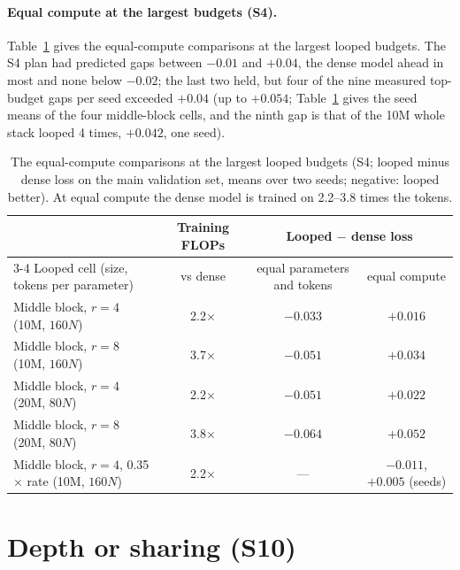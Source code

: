 \paragraph{Equal compute at the largest budgets (S4).} Table~\ref{tab:equalcompute} gives the equal-compute comparisons at the
largest looped budgets. The S4 plan had predicted gaps between $-0.01$ and $+0.04$, the dense model ahead in most and none
below $-0.02$; the last two held, but four of the nine measured top-budget gaps per seed exceeded $+0.04$ (up to $+0.054$;
Table~\ref{tab:equalcompute} gives the seed means of the four middle-block cells, and the ninth gap is that of the 10M
whole stack looped 4 times, $+0.042$, one seed).

\begin{table}[h]
  \centering
  \caption{The equal-compute comparisons at the largest looped budgets (S4; looped minus dense loss on the main
  validation set, means over two seeds; negative: looped better). At equal compute the dense model is trained on 2.2--3.8
  times the tokens.}
  \label{tab:equalcompute}
  \footnotesize
  \begin{tabular}{lccc}
    \toprule
    & Training FLOPs & \multicolumn{2}{c}{Looped $-$ dense loss} \\
    \cmidrule(lr){3-4}
    Looped cell (size, tokens per parameter) & vs dense & equal parameters and tokens & equal compute \\
    \midrule
    Middle block, $r=4$ (10M, $160N$) & 2.2$\times$ & $-0.033$ & $+0.016$ \\
    Middle block, $r=8$ (10M, $160N$) & 3.7$\times$ & $-0.051$ & $+0.034$ \\
    Middle block, $r=4$ (20M, $80N$)  & 2.2$\times$ & $-0.051$ & $+0.022$ \\
    Middle block, $r=8$ (20M, $80N$)  & 3.8$\times$ & $-0.064$ & $+0.052$ \\
    \midrule
    Middle block, $r=4$, 0.35$\times$ rate (10M, $160N$) & 2.2$\times$ & --- & $-0.011$, $+0.005$ (seeds) \\
    \bottomrule
  \end{tabular}
\end{table}

\section{Depth or sharing (S10)}
\label{app:s10}

